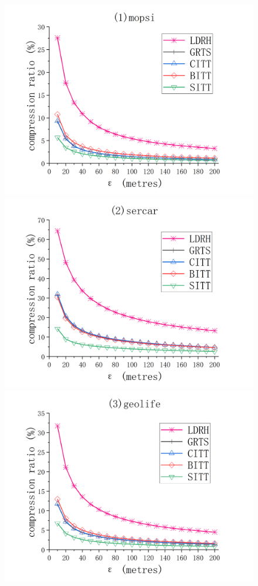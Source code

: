{\begin{figure}[tb!]
	\centering
	\includegraphics[scale = 0.555]{figures/Fig-mopsi-compression-ratio.png}\hspace{1ex}
	\includegraphics[scale = 0.555]{figures/Fig-sercar-compression-ratio.png}\hspace{1ex}
	\includegraphics[scale = 0.555]{figures/Fig-geolife-compression-ratio.png}\hspace{0ex}

\end{figure}}
